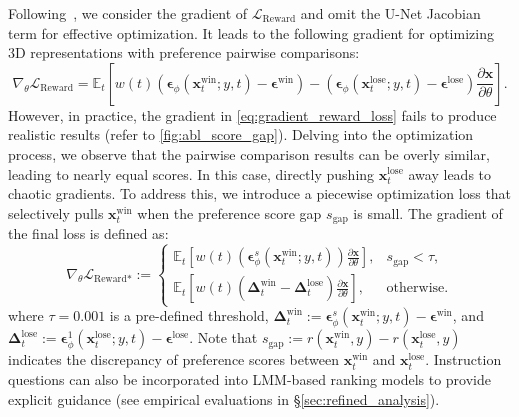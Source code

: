 Following~\citep{poole2022dreamfusion}, we consider the gradient of $\mathcal{L}_{\text{Reward}}$ and omit the U-Net Jacobian term for effective optimization.
It leads to the following gradient for optimizing 3D representations with preference pairwise comparisons:
\begin{equation}\label{eq:gradient_reward_loss}
    \nabla_\theta \mathcal{L}_{\text{Reward}}  = 
    \mathbb{E}_{t} \left[ w(t) \left( \bm{\epsilon}_\phi(\mathbf{x}_t^{\text{win}}; y, t) - \bm{\epsilon}^{\text{win}} \right)
    - \left( \bm{\epsilon}_\phi(\mathbf{x}_t^{\text{lose}}; y, t) - \bm{\epsilon}^{\text{lose}} \right) \frac{\partial \mathbf{x}}{\partial \theta} \right].   
\end{equation}
However, in practice, the gradient in \cref{eq:gradient_reward_loss} fails to produce realistic results (refer to \cref{fig:abl_score_gap}).
Delving into the optimization process, we observe that the pairwise comparison results can be overly similar, leading to nearly equal scores.
In this case, directly pushing $\mathbf{x}_t^\text{lose}$ away leads to chaotic gradients.
To address this, we introduce a piecewise optimization loss that selectively pulls $\mathbf{x}_t^\text{win}$ when the preference score gap $s_\text{gap}$ is small.
The gradient of the final loss is defined as:
\begin{equation}
    \nabla_\theta \mathcal{L}_{\text{Reward*}} :=
\begin{cases}
\mathbb{E}_{t} \left[ w(t) \left( \bm{\epsilon}^s_\phi(\mathbf{x}_t^{\text{win}}; y, t) \right) \frac{\partial \mathbf{x}}{\partial \theta} \right], & s_\text{gap} < \tau, \\
\mathbb{E}_{t} \left[ w(t) \left( \mathbf{\Delta}_t^{\text{win}} - \mathbf{\Delta}_t^{\text{lose}}
\right) \frac{\partial \mathbf{x}}{\partial \theta} \right], & \text{otherwise}.
\end{cases}
\label{eq:reward}
\end{equation}
where $\tau=0.001$ is a pre-defined threshold, $\mathbf{\Delta}_t^{\text{win}} :=\bm{\epsilon}^s_\phi(\mathbf{x}_t^{\text{win}}; y, t) - \bm{\epsilon}^{\text{win}}$, and $\mathbf{\Delta}_t^{\text{lose}} := \bm{\epsilon}^1_\phi(\mathbf{x}_t^{\text{lose}}; y, t) - \bm{\epsilon}^{\text{lose}}$.
Note that $s_\text{gap} := r(\mathbf{x}_t^{\text{win}}, y) - r(\mathbf{x}_t^{\text{lose}}, y)$ indicates the discrepancy of preference scores between $\mathbf{x}_t^{\text{win}}$ and $\mathbf{x}_t^{\text{lose}}$. 
Instruction questions can also be incorporated into LMM-based ranking models to provide explicit guidance (see empirical evaluations in \S\ref{sec:refined_analysis}). 

